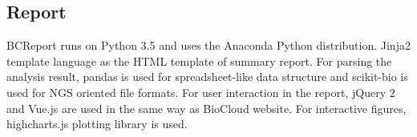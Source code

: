 \subsection{Report}


BCReport runs on Python 3.5 and uses the Anaconda Python distribution. Jinja2
template language as the HTML template of summary report. For parsing the
analysis result, pandas is used for spreadsheet-like data structure and
scikit-bio is used for NGS oriented file formats. For user interaction in the
report, jQuery 2 and Vue.js are used in the same way as BioCloud website. For
interactive figures, highcharts.js plotting library is used.

